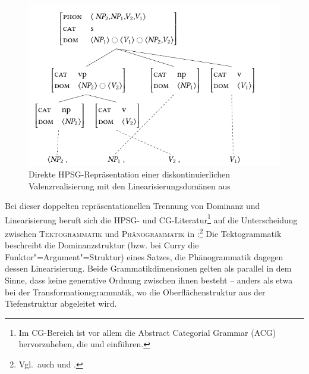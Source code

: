 \begin{figure}[t]
\centering
\includegraphics{graphics/abb64.pdf}
\caption{\label{fig-kohaerenz-strategien-2}Direkte HPSG-Repräsentation einer diskontinuierlichen Valenzrealisierung mit den Linearisierungsdomänen aus \cite{Reape:92,Reape:94,Reape:96}}
\end{figure}
 
Bei dieser doppelten repräsentationellen Trennung von Dominanz und Linearisierung beruft sich die HPSG- und CG-Literatur\footnote{Im CG-Bereich ist vor allem die Abstract Categorial Grammar (ACG) hervorzuheben, die \cite{deGroote:01} und \cite{Muskens:01} einführen.} auf die Unterscheidung zwischen \textsc{Tektogrammatik} und \textsc{Phänogrammatik} in \citet[65f]{Curry:63}:\footnote{Vgl.\ auch \citet[12ff]{Dowty:96} und \citet[35ff]{Kathol:00}.} Die Tektogrammatik beschreibt die Dominanzstruktur (bzw. bei Curry die Funktor"=Argument"=Struktur) eines Satzes, die Phänogrammatik dagegen dessen Linearisierung. Beide Grammatikdimensionen gelten als parallel in dem Sinne, dass keine generative Ordnung zwischen ihnen besteht -- anders als etwa bei der Transformationsgrammatik, wo die Oberflächenstruktur aus der Tiefenstruktur abgeleitet wird. 


